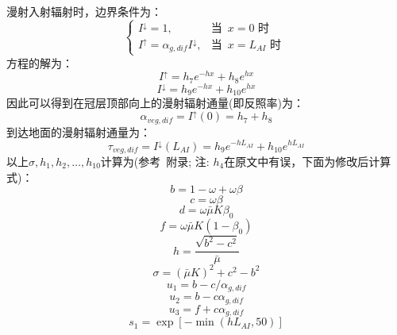 漫射入射辐射时，边界条件为：
\begin{equation}
\begin{cases}
I^{\downarrow}=1, &\text {当 }\, x=0 \text { 时 } \\
I^{\uparrow}=\alpha_{g, dif} I^{\downarrow}, &\text {当 }\, x=L_{A I} \text { 时 }
\end{cases}
\end{equation}
方程的解为：
\begin{equation}
I^{\uparrow}=h_{7} e^{-h x}+h_{8} e^{h x}
\end{equation}
%
\begin{equation}
I^{\downarrow}=h_{9} e^{-h x}+h_{10} e^{h x}
\end{equation}
因此可以得到在冠层顶部向上的漫射辐射通量(即反照率)为：
\begin{equation}
\alpha_{veg, dif}=I^{\uparrow}(0)=h_{7}+h_{8}
\end{equation}
到达地面的漫射辐射通量为：
\begin{equation}
\tau_{veg, dif}=I^{\downarrow}\left(L_{A I}\right)=h_{9} e^{-h L_{AI}}+h_{10} e^{h L_{AI}}
\end{equation}
以上$\sigma,h_1,h_2,\ldots,h_{10}$计算为(参考~\citet{sellers1985canopy}附录; 注: $h_4$在原文中有误，下面为修改后计算式)：
\begin{equation}
b=1-\omega+\omega \beta
\end{equation}
\begin{equation}
c=\omega \beta
\end{equation}
\begin{equation}
d=\omega \bar{\mu} K \beta_{0}
\end{equation}
\begin{equation}
f=\omega \bar{\mu} K\left(1-\beta_{0}\right)
\end{equation}
\begin{equation}
h=\frac{\sqrt{b^{2}-c^{2}}}{\bar{\mu}}
\end{equation}
\begin{equation}
\sigma=(\bar{\mu} K)^{2}+c^{2}-b^{2}
\end{equation}
\begin{equation}
u_{1}=b-c / \alpha_{g, dif}
\end{equation}
\begin{equation}
u_{2}=b-c \alpha_{g, dif}
\end{equation}
\begin{equation}
u_{3}=f+c \alpha_{g, dif}
\end{equation}
\begin{equation}
s_{1}=\exp \left[-\min \left(h L_{AI}, 50\right)\right]
\end{equation}
